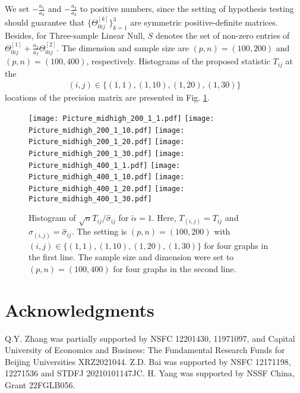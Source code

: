 \documentclass[review]{elsarticle}
\newcommand{\1}{{\bf 1}}
\newcommand{\0}{{\bf 0}}
\newcommand{\bqn}{\begin{eqnarray*}}
\newcommand{\eqn}{\end{eqnarray*}}
\begin{document}
 We set $-\frac{a_1}{a_3}$ and $-\frac{a_2}{a_3}$ to positive numbers, since the setting of hypothesis testing should guarantee that $\{\Theta^{[k]}_{0ij}\}_{k=1}^{3}$ are symmetric positive-definite matrices.
 Besides, for Three-sample Linear Null, $S$ denotes the set of non-zero entries of $\Theta^{[1]}_{0ij}+\frac{a_2}{a_3}\Theta^{[2]}_{0ij}$.
 The dimension and sample size are $(p,n)=(100,200)$ and $(p,n)=(100,400)$, respectively.
 Histograms of the proposed statistic $T_{ij}$ at the
\bqn
(i,j)\in\{(1,1),(1,10),(1,20),(1,30)\}
\eqn
 locations of the precision matrix are presented in Fig. \ref{Fluc}.

\begin{figure}[htbp]
	\begin{center}
        \texttt{[image: Picture\_midhigh\_200\_1\_1.pdf]}
        \texttt{[image: Picture\_midhigh\_200\_1\_10.pdf]}
        \texttt{[image: Picture\_midhigh\_200\_1\_20.pdf]}
        \texttt{[image: Picture\_midhigh\_200\_1\_30.pdf]}
        \texttt{[image: Picture\_midhigh\_400\_1\_1.pdf]}
        \texttt{[image: Picture\_midhigh\_400\_1\_10.pdf]}
        \texttt{[image: Picture\_midhigh\_400\_1\_20.pdf]}
        \texttt{[image: Picture\_midhigh\_400\_1\_30.pdf]}
  \caption{\label{Fluc}Histogram of $\sqrt{n}T_{ij}/\hat{\sigma}_{ij}$ for $\tilde\alpha=1$. Here, $T_{(i,j)}=T_{ij}$ and $\hat{\sigma}_{(i,j)}=\hat{\sigma}_{ij}$. The setting is $(p,n)=(100,200)$ with $(i,j)\in\{(1,1), (1,10), (1,20), (1,30)\}$ for four graphs in the first line. The sample size and dimension were set to $(p,n)=(100,400)$ for four graphs in the second line.}
        \end{center}
\end{figure}



\section*{Acknowledgments}


Q.Y. Zhang was partially supported by NSFC 12201430, 11971097, and Capital University of Economics and Business: The Fundamental Research Funds for Beijing Universities XRZ2021044.
Z.D. Bai was supported by NSFC 12171198, 12271536 and STDFJ 20210101147JC.
H. Yang was supported by NSSF China, Grant 22FGLB056.
\end{document}
